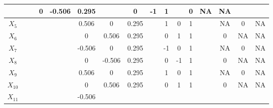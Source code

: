 \documentclass[a4paper,man,natbib]{apa6}
\begin{document}
\begin{linenumbers}
\begin{table}[]
\begin{adjustbox}{width = 0.9\textwidth}
\begin{tabular}{cccccccccccccccc}
		&
		&
		&
		\multicolumn{1}{c}{0} &
		\multicolumn{1}{c}{-0.506} &
		\multicolumn{1}{c}{0.295} &
		\multicolumn{1}{c}{} &
		\multicolumn{1}{c}{0} &
		\multicolumn{1}{c}{-1} &
		\multicolumn{1}{c}{1} &
		\multicolumn{1}{c}{} &
		\multicolumn{1}{c}{0} &
		\multicolumn{1}{c}{NA} &
		\multicolumn{1}{c}{NA} \\ \hline
		\textbf{$X_{5}$} &
		&
		&
		&
		&
		\multicolumn{1}{c}{0.506} &
		\multicolumn{1}{c}{0} &
		\multicolumn{1}{c}{0.295} &
		\multicolumn{1}{c}{} &
		\multicolumn{1}{c}{1} &
		\multicolumn{1}{c}{0} &
		\multicolumn{1}{c}{1} &
		\multicolumn{1}{c}{} &
		\multicolumn{1}{c}{NA} &
		\multicolumn{1}{c}{0} &
		\multicolumn{1}{c}{NA} \\ \hline
		\textbf{$X_{6}$} &
		&
		&
		&
		&
		\multicolumn{1}{c}{0} &
		\multicolumn{1}{c}{0.506} &
		\multicolumn{1}{c}{0.295} &
		\multicolumn{1}{c}{} &
		\multicolumn{1}{c}{0} &
		\multicolumn{1}{c}{1} &
		\multicolumn{1}{c}{1} &
		\multicolumn{1}{c}{} &
		\multicolumn{1}{c}{0} &
		\multicolumn{1}{c}{NA} &
		\multicolumn{1}{c}{NA} \\ \hline
		\textbf{$X_{7}$} &
		&
		&
		&
		&
		\multicolumn{1}{c}{-0.506} &
		\multicolumn{1}{c}{0} &
		\multicolumn{1}{c}{0.295} &
		\multicolumn{1}{c}{} &
		\multicolumn{1}{c}{-1} &
		\multicolumn{1}{c}{0} &
		\multicolumn{1}{c}{1} &
		\multicolumn{1}{c}{} &
		\multicolumn{1}{c}{NA} &
		\multicolumn{1}{c}{0} &
		\multicolumn{1}{c}{NA} \\ \hline
		\textbf{$X_{8}$} &
		&
		&
		&
		&
		\multicolumn{1}{c}{0} &
		\multicolumn{1}{c}{-0.506} &
		\multicolumn{1}{c}{0.295} &
		\multicolumn{1}{c}{} &
		\multicolumn{1}{c}{0} &
		\multicolumn{1}{c}{-1} &
		\multicolumn{1}{c}{1} &
		\multicolumn{1}{c}{} &
		\multicolumn{1}{c}{0} &
		\multicolumn{1}{c}{NA} &
		\multicolumn{1}{c}{NA} \\ \hline
		\textbf{$X_{9}$} &
		&
		&
		&
		&
		\multicolumn{1}{c}{0.506} &
		\multicolumn{1}{c}{0} &
		\multicolumn{1}{c}{0.295} &
		&
		\multicolumn{1}{c}{1} &
		\multicolumn{1}{c}{0} &
		\multicolumn{1}{c}{1} &
		&
		\multicolumn{1}{c}{NA} &
		\multicolumn{1}{c}{0} &
		\multicolumn{1}{c}{NA} \\ \hline
		\textbf{$X_{10}$} &
		&
		&
		&
		&
		\multicolumn{1}{c}{0} &
		\multicolumn{1}{c}{0.506} &
		\multicolumn{1}{c}{0.295} &
		&
		\multicolumn{1}{c}{0} &
		\multicolumn{1}{c}{1} &
		\multicolumn{1}{c}{1} &
		&
		\multicolumn{1}{c}{0} &
		\multicolumn{1}{c}{NA} &
		\multicolumn{1}{c}{NA} \\ \hline
		\textbf{$X_{11}$} &
		&
		&
		&
		&
		\multicolumn{1}{c}{-0.506} &

\end{tabular}
\end{adjustbox}
\end{table}
\end{linenumbers}
\end{document}
